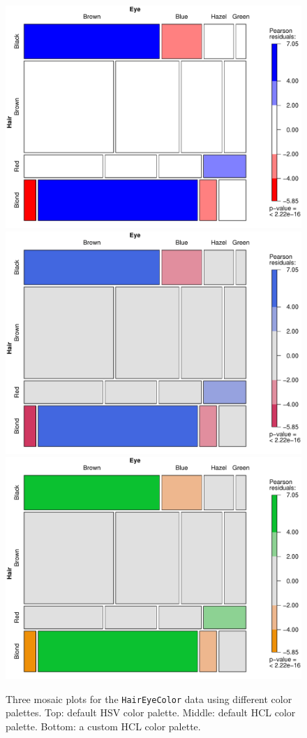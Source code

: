 \documentclass{Z}
\newcommand{\data}[1]{\texttt{#1}}
\begin{document}
\begin{figure}[htbp]
\begin{center}
\includegraphics{strucplot-haireyefig1}
\includegraphics{strucplot-haireyefig2}
\includegraphics{strucplot-haireyefig3}
\caption{Three mosaic plots for the \data{HairEyeColor} data using
  different color palettes. Top: default HSV color palette. Middle: default HCL
 color palette. Bottom: a custom HCL color palette.}
\label{fig:haireye}
\end{center}
\end{figure}
\end{document}
